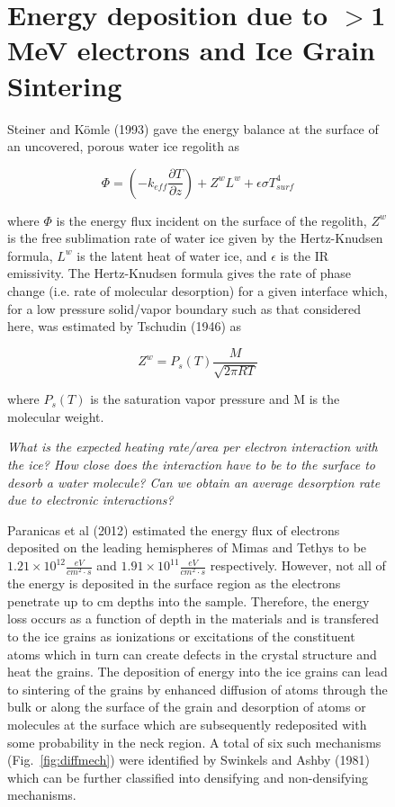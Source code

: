 \documentclass[11pt]{article} %
\begin{document}
\begin{figure}[ht]
\begin{Table}
\section{Energy deposition due to $>$1 MeV electrons and Ice Grain Sintering}
	Steiner and K\"{o}mle (1993) gave the energy balance at the surface of an uncovered, porous water ice regolith as
	
	\begin{equation}
	\Phi = \left( - k_{eff} \frac{\partial T}{\partial z} \right) + Z^{w}L^{w} +\epsilon \sigma T_{surf}^{4}
	\end{equation}
	
	where $\Phi$ is the energy flux incident on the surface of the regolith, $Z^{w}$ is the free sublimation rate of water ice given by the Hertz-Knudsen formula, $L^{w}$ is the latent heat of water ice, and $\epsilon$ is the IR emissivity. The Hertz-Knudsen formula gives the rate of phase change (i.e. rate of molecular desorption) for a given interface which, for a low pressure solid/vapor boundary such as that considered here, was estimated by Tschudin (1946) as
	
	\begin{equation}
	Z^{w} = P_{s}(T)\frac{M}{\sqrt{2\pi R T}}
	\end{equation}
	
	where $P_{s}(T)$ is the saturation vapor pressure and M is the molecular weight.
	
	\emph{What is the expected heating rate/area per electron interaction with the ice? How close does the interaction have to be to the surface to desorb a water molecule? Can we obtain an average desorption rate due to electronic interactions?}

	Paranicas et al (2012) estimated the energy flux of electrons deposited on the leading hemispheres of Mimas and Tethys to be $1.21\times 10^{12} \frac{eV}{cm^{2}\cdot s}$ and $1.91\times 10^{11} \frac{eV}{cm^{2}\cdot s}$ respectively. However, not all of the energy is deposited in the surface region as the electrons penetrate up to cm depths into the sample. Therefore, the energy loss occurs as a function of depth in the materials and is transfered to the ice grains as ionizations or excitations of the constituent atoms which in turn can create defects in the crystal structure and heat the grains. The deposition of energy into the ice grains can lead to sintering of the grains by enhanced diffusion of atoms through the bulk or along the surface of the grain and desorption of atoms or molecules at the surface which are subsequently redeposited with some probability in the neck region. A total of six such mechanisms (Fig.~\ref{fig:diffmech}) were identified by Swinkels and Ashby (1981) which can be further classified into densifying and non-densifying mechanisms.
	

\end{Table}
\end{figure}
\end{document}
